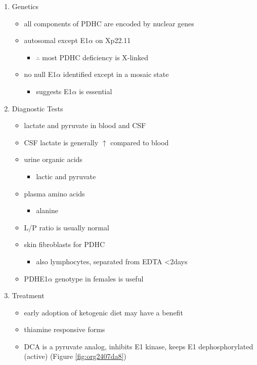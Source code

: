 \documentclass{scrartcl}
\begin{document}
\begin{enumerate}
\item Genetics
\label{sec:org8a4e4b7}
\begin{itemize}
\item all components of PDHC are encoded by nuclear genes
\item autosomal except E1\(\alpha\) on Xp22.11
\begin{itemize}
\item \(\therefore\) most PDHC deficiency is X-linked
\end{itemize}
\item no null E1\(\alpha\) identified except in a mosaic state
\begin{itemize}
\item suggests E1\(\alpha\) is essential
\end{itemize}
\end{itemize}

\item Diagnostic Tests
\label{sec:orgbfba18b}
\begin{itemize}
\item lactate and pyruvate in blood and CSF
\item CSF lactate is generally \(\uparrow\) compared to blood
\item urine organic acids
\begin{itemize}
\item lactic and pyruvate
\end{itemize}
\item plasma amino acids
\begin{itemize}
\item alanine
\end{itemize}
\item L/P ratio is usually normal
\item skin fibroblasts for PDHC
\begin{itemize}
\item also lymphocytes, separated from EDTA <2days
\end{itemize}
\item PDHE1\(\alpha\) genotype in females is useful
\end{itemize}

\item Treatment
\label{sec:org92531d7}
\begin{itemize}
\item early adoption of ketogenic diet may have a benefit
\item thiamine responsive forms
\item DCA is a pyruvate analog, inhibits E1 kinase, keeps E1 dephosphorylated (active) (Figure \ref{fig:org2407da8})
\end{itemize}


\end{enumerate}
\end{document}
